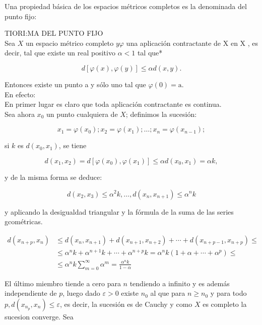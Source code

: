 \documentclass[10pt]{article}
\theoremstyle{plain}
\theoremstyle{definition}
\theoremstyle{remark}
\begin{document}
Una propiedad básica de los espacios métricos completos es la denominada del punto fijo:

TIORI:MA DEL PUNTO FIJO\\
Sea $X$ un espacio métrico completo $y \varphi$ una aplicación contractante de X en X , es decir, tal que existe un real positivo $\alpha<1$ tal que*

$$
d[\varphi(x), \varphi(y)] \leqslant \alpha d(x, y) .
$$

Entonces existe un punto a y sólo uno tal que $\varphi(0)=\mathrm{a}$.\\
En efecto:\\
En primer lugar es claro que toda aplicación contractante es continua.\\
Sea ahora $x_{0}$ un punto cualquiera de $X$; definimos la sucesión:

$$
x_{1}=\varphi\left(x_{0}\right) ; x_{2}=\varphi\left(x_{1}\right) ; \ldots ; x_{n}=\varphi\left(x_{n-1}\right) ;
$$

si $k$ es $d\left(x_{0}, x_{1}\right)$, se tiene

$$
d\left(x_{1}, x_{2}\right)=d\left[\varphi\left(x_{0}\right), \varphi\left(x_{1}\right)\right] \leqslant \alpha d\left(x_{0}, x_{1}\right)=\alpha k,
$$

y de la misma forma se deduce:

$$
d\left(x_{2}, x_{3}\right) \leqslant \alpha^{2} k, \ldots, d\left(x_{n}, x_{n+1}\right) \leqslant \alpha^{n} k
$$

y aplicando la desigualdad triangular y la fórmula de la suma de las series gcométricas.

$$
\begin{aligned}
d\left(x_{n+p}, x_{n}\right) & \leqslant d\left(x_{n}, x_{n+1}\right)+d\left(x_{n+1}, x_{n+2}\right)+\cdots+d\left(x_{n+p-1}, x_{n+p}\right) \leqslant \\
& \leqslant \alpha^{n} k+\alpha^{n+1} k+\cdots+\alpha^{n+p} k=\alpha^{n} k\left(1+\alpha+\cdots+\alpha^{p}\right) \leqslant \\
& \leqslant \alpha^{n} k \sum_{m=0}^{\infty} \alpha^{m}=\frac{\alpha^{n} k}{1-\alpha}
\end{aligned}
$$

El último miembro tiende a cero para $n$ tendiendo a infinito y es además independiente de $p$, luego dado $\varepsilon>0$ existe $n_{0}$ al que para $n \geqslant n_{0}$ y para todo $p, d\left(x_{n_{p}}, x_{n}\right) \leqslant \varepsilon$, es decir, la sucesión es de Cauchy y como $X$ es completo la sucesion converge. Sea
\end{document}
